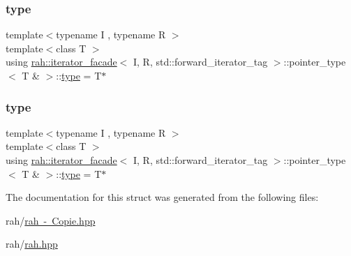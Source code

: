 \subsubsection{\texorpdfstring{type}{type}\hspace{0.1cm}{\footnotesize\ttfamily [1/2]}}
{\footnotesize\ttfamily template$<$typename I , typename R $>$ \\
template$<$class T $>$ \\
using \mbox{\hyperlink{structrah_1_1iterator__facade}{rah\+::iterator\+\_\+facade}}$<$ I, R, std\+::forward\+\_\+iterator\+\_\+tag $>$\+::pointer\+\_\+type$<$ T \& $>$\+::\mbox{\hyperlink{structrah_1_1iterator__facade_3_01_i_00_01_r_00_01std_1_1forward__iterator__tag_01_4_1_1pointer__type_3_01_t_01_6_01_4_ae2819aa7fbf4febbc6f3cb0034745653}{type}} =  T$\ast$}

\mbox{\label{structrah_1_1iterator__facade_3_01_i_00_01_r_00_01std_1_1forward__iterator__tag_01_4_1_1pointer__type_3_01_t_01_6_01_4_ae2819aa7fbf4febbc6f3cb0034745653}} 
\subsubsection{\texorpdfstring{type}{type}\hspace{0.1cm}{\footnotesize\ttfamily [2/2]}}
{\footnotesize\ttfamily template$<$typename I , typename R $>$ \\
template$<$class T $>$ \\
using \mbox{\hyperlink{structrah_1_1iterator__facade}{rah\+::iterator\+\_\+facade}}$<$ I, R, std\+::forward\+\_\+iterator\+\_\+tag $>$\+::pointer\+\_\+type$<$ T \& $>$\+::\mbox{\hyperlink{structrah_1_1iterator__facade_3_01_i_00_01_r_00_01std_1_1forward__iterator__tag_01_4_1_1pointer__type_3_01_t_01_6_01_4_ae2819aa7fbf4febbc6f3cb0034745653}{type}} =  T$\ast$}



The documentation for this struct was generated from the following files\+:\begin{DoxyCompactItemize}
\item 
rah/\mbox{\hyperlink{rah_01-_01_copie_8hpp}{rah -\/ Copie.\+hpp}}\item 
rah/\mbox{\hyperlink{rah_8hpp}{rah.\+hpp}}\end{DoxyCompactItemize}
